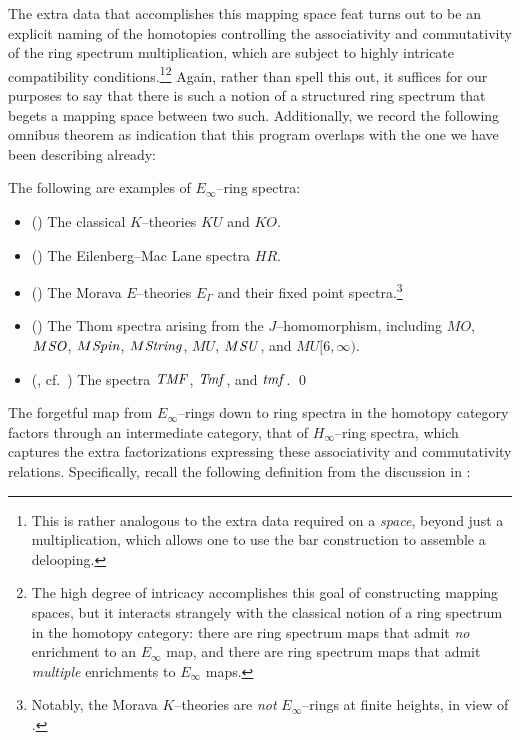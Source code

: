 The extra data that accomplishes this mapping space feat turns out to be an explicit naming of the homotopies controlling the associativity and commutativity of the ring spectrum multiplication, which are subject to highly intricate compatibility conditions.\footnote{This is rather analogous to the extra data required on a \emph{space}, beyond just a multiplication, which allows one to use the bar construction to assemble a delooping.}\footnote{The high degree of intricacy accomplishes this goal of constructing mapping spaces, but it interacts strangely with the classical notion of a ring spectrum in the homotopy category: there are ring spectrum maps that admit \emph{no} enrichment to an \(E_\infty\) map, and there are ring spectrum maps that admit \emph{multiple} enrichments to \(E_\infty\) maps.}  Again, rather than spell this out, it suffices for our purposes to say that there is such a notion of a structured ring spectrum that begets a mapping space between two such.  Additionally, we record the following omnibus theorem as indication that this program overlaps with the one we have been describing already:
\begin{theorem}
The following are examples of \(E_\infty\)--ring spectra:
\begin{itemize}
    \item (\cite[Section VIII.1]{MayRingSpacesSpectra}) The classical \(K\)--theories \(KU\) and \(KO\).
    \item (\cite[Section VIII.1]{MayRingSpacesSpectra}) The Eilenberg--Mac Lane spectra \(HR\).
    \item (\cite[Corollary 7.6--7]{GoerssHopkins}) The Morava \(E\)--theories \(E_\Gamma\) and their fixed point spectra.\footnote{Notably, the Morava \(K\)--theories are \emph{not} \(E_\infty\)--rings at finite heights, in view of .}
    \item (\cite[Section IV.3]{MayRingSpacesSpectra}) The Thom spectra arising from the \(J\)--homomorphism, including \(MO\), \(M\mathit{SO}\), \(M\mathit{Spin}\), \(M\mathit{String}\), \(MU\), \(M\mathit{SU}\), and \(MU[6, \infty)\).
    \item (\cite{BehrensConstruction}, cf.\ ) The spectra \(\mathit{TMF}\), \(\mathit{Tmf}\), and \(\mathit{tmf}\). \qed
\end{itemize}
\end{theorem}

The forgetful map from \(E_\infty\)--rings down to ring spectra in the homotopy category factors through an intermediate category, that of \(H_\infty\)--ring spectra, which captures the extra factorizations expressing these associativity and commutativity relations.  Specifically, recall the following definition from the discussion in :

